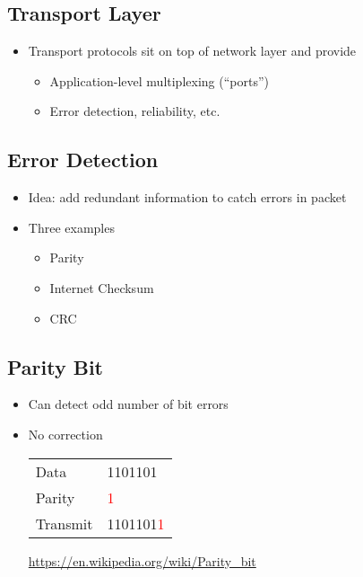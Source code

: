 \subsection{Transport Layer}
\begin{itemize}[nosep]
    \item Transport protocols sit on top of network layer and provide
          \begin{itemize}[nosep]
              \item Application-level multiplexing (``ports'')
              \item Error detection, reliability, etc.
          \end{itemize}
\end{itemize}
\subsection{Error Detection}
\begin{itemize}[nosep]
    \item Idea: add redundant information to catch errors in packet
    \item Three examples
          \begin{itemize}[nosep]
              \item Parity
              \item Internet Checksum
              \item CRC
          \end{itemize}
\end{itemize}
\subsection{Parity Bit}
\begin{itemize}[nosep]
    \item Can detect odd number of bit errors
    \item No correction

          \begin{table}[H]
              \begin{tabular}{ll}
                  Data     & 1101101                   \\
                  Parity   & \textcolor{red}{1}        \\
                  Transmit & 1101101\textcolor{red}{1}
              \end{tabular}
          \end{table}
          \url{https://en.wikipedia.org/wiki/Parity_bit}
\end{itemize}

